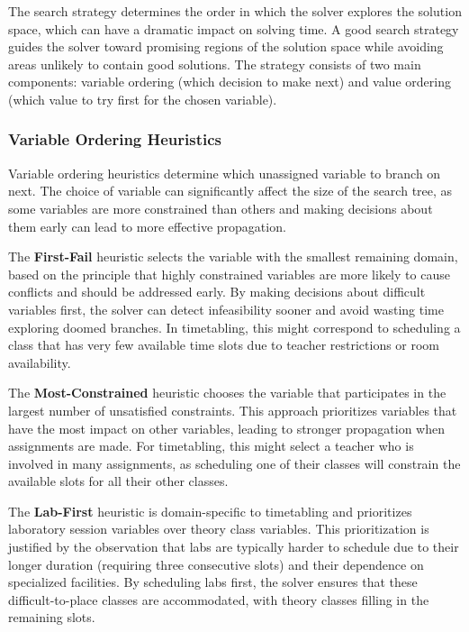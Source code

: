 \documentclass[12pt,a4paper]{article}
\begin{document}
The search strategy determines the order in which the solver explores the solution space, which can have a dramatic impact on solving time. A good search strategy guides the solver toward promising regions of the solution space while avoiding areas unlikely to contain good solutions. The strategy consists of two main components: variable ordering (which decision to make next) and value ordering (which value to try first for the chosen variable).

\subsubsection{Variable Ordering Heuristics}

Variable ordering heuristics determine which unassigned variable to branch on next. The choice of variable can significantly affect the size of the search tree, as some variables are more constrained than others and making decisions about them early can lead to more effective propagation.

The \textbf{First-Fail} heuristic selects the variable with the smallest remaining domain, based on the principle that highly constrained variables are more likely to cause conflicts and should be addressed early. By making decisions about difficult variables first, the solver can detect infeasibility sooner and avoid wasting time exploring doomed branches. In timetabling, this might correspond to scheduling a class that has very few available time slots due to teacher restrictions or room availability.

The \textbf{Most-Constrained} heuristic chooses the variable that participates in the largest number of unsatisfied constraints. This approach prioritizes variables that have the most impact on other variables, leading to stronger propagation when assignments are made. For timetabling, this might select a teacher who is involved in many assignments, as scheduling one of their classes will constrain the available slots for all their other classes.

The \textbf{Lab-First} heuristic is domain-specific to timetabling and prioritizes laboratory session variables over theory class variables. This prioritization is justified by the observation that labs are typically harder to schedule due to their longer duration (requiring three consecutive slots) and their dependence on specialized facilities. By scheduling labs first, the solver ensures that these difficult-to-place classes are accommodated, with theory classes filling in the remaining slots.
\end{document}
